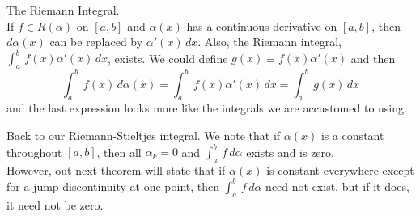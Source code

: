 \begin{theorem}
The Riemann Integral.\\
If $f\in R(\alpha)$ on $[a,b]$ and $\alpha(x)$ has a continuous derivative on $[a,b]$, then $d\alpha(x)$ can be replaced by $\alpha'(x)\, dx$. Also, the Riemann integral,
$\displaystyle \int_a^b\, f(x)\alpha'(x)\, dx$, exists.
We could define $\displaystyle g(x) \equiv f(x)\alpha'(x)$ and then 
$$\int_a^b\, f(x)\, d\alpha(x) = \int_a^b\, f(x)\alpha'(x)\, dx = \int_a^b\, g(x)\, dx$$ and the last expression looks more like the integrals we are accustomed to using. 
\end{theorem}

Back to our Riemann-Stieltjes integral. We note that if $\alpha(x)$ is a constant throughout $[a,b]$, then all $\alpha_k = 0$ and $\displaystyle \int_a^b \, f\, d\alpha$ exists and is zero.\\
However, out next theorem will state that if $\alpha(x)$ is constant everywhere except for a jump discontinuity at one point, then $\displaystyle \int_a^b\, f\, d\alpha$ need not exist, but if it does, 
it need not be zero.

